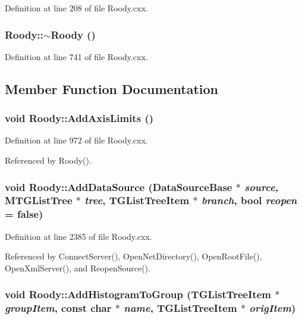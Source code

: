 Definition at line 208 of file Roody.cxx.
\subsubsection[{$\sim$Roody}]{\setlength{\rightskip}{0pt plus 5cm}Roody::$\sim$Roody ()\hspace{0.3cm}{\ttfamily  [virtual]}}\label{classRoody_a06c21e28587ea291680fe78894794265}


Definition at line 741 of file Roody.cxx.

\subsection{Member Function Documentation}
\subsubsection[{AddAxisLimits}]{\setlength{\rightskip}{0pt plus 5cm}void Roody::AddAxisLimits ()\hspace{0.3cm}{\ttfamily  [private]}}\label{classRoody_afa5dec915081c254b4cde9afa392c925}


Definition at line 972 of file Roody.cxx.

Referenced by Roody().
\subsubsection[{AddDataSource}]{\setlength{\rightskip}{0pt plus 5cm}void Roody::AddDataSource (DataSourceBase $\ast$ {\em source}, \/  {\bf MTGListTree} $\ast$ {\em tree}, \/  TGListTreeItem $\ast$ {\em branch}, \/  bool {\em reopen} = {\ttfamily false})\hspace{0.3cm}{\ttfamily  [private]}}\label{classRoody_a7bd00f34ffb0b9a91ab553576c801ad8}


Definition at line 2385 of file Roody.cxx.

Referenced by ConnectServer(), OpenNetDirectory(), OpenRootFile(), OpenXmlServer(), and ReopenSource().
\subsubsection[{AddHistogramToGroup}]{\setlength{\rightskip}{0pt plus 5cm}void Roody::AddHistogramToGroup (TGListTreeItem $\ast$ {\em groupItem}, \/  const char $\ast$ {\em name}, \/  TGListTreeItem $\ast$ {\em origItem})\hspace{0.3cm}{\ttfamily  [private]}}\label{classRoody_aafdf330e50dd7a70980d320e18602103}


